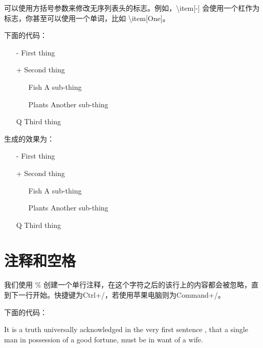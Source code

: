 可以使用方括号参数来修改无序列表头的标志。例如，\textbackslash item[-] 会使用一个杠作为标志，你甚至可以使用一个单词，比如 \textbackslash item[One]。

下面的代码：

\begin{python}
\begin{itemize}
	\item[-] First thing
	
	\item[+] Second thing
	\begin{itemize}
		\item[Fish] A sub-thing
		
		\item[Plants] Another sub-thing
	\end{itemize}
	
	\item[Q] Third thing
\end{itemize}
\end{python}


生成的效果为：

\begin{itemize}
	\item[-] First thing
	
	\item[+] Second thing
	\begin{itemize}
		\item[Fish] A sub-thing
		
		\item[Plants] Another sub-thing
	\end{itemize}
	
	\item[Q] Third thing
\end{itemize}

\section{注释和空格}

我们使用 \% 创建一个单行注释，在这个字符之后的该行上的内容都会被忽略，直到下一行开始。快捷键为Ctrl+/，若使用苹果电脑则为Command+/。

下面的代码：

\begin{python}
It is a truth universally acknowledged %
in the very first sentence , 
that a single man in possession of a good fortune,
must be in want of a wife.
\end{python}

